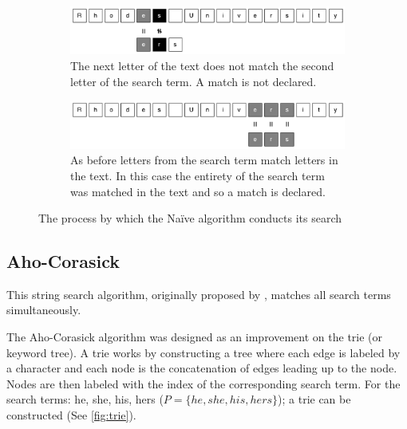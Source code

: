 \documentclass{article}
\begin{document}
\begin{figure}[h!bt]
  \begin{subfigure}{\textwidth}
  \makeatletter
  \includegraphics[width=\textwidth]{images/naive-4}
  \caption{The next letter of the text does not match the second letter of the search term. A match is not declared.}
  \end{subfigure}
  
  \begin{subfigure}{\textwidth}
  \makeatletter
  \includegraphics[width=\textwidth]{images/naive-5}
  \caption{As before letters from the search term match letters in the text. In this case the entirety of the search term was matched in the text and so a match is declared.}
  \end{subfigure}
  
  \caption{The process by which the Na{\"i}ve algorithm conducts its search}
  \label{fig:naive}
\end{figure}

\subsection{Aho-Corasick} \label{sec:aho-corasick}
This string search algorithm, originally proposed by \cite{Aho1975}, matches all search terms simultaneously.

The Aho-Corasick algorithm was designed as an improvement on the trie (or keyword tree). A trie works by constructing a tree where each edge is labeled by a character and each node is the concatenation of edges leading up to the node. Nodes are then labeled with the index of the corresponding search term. For the search terms: he, she, his, hers (\(P = \{he, she, his, hers\}\)); a trie can be constructed (See \ref{fig:trie}).
\end{document}
